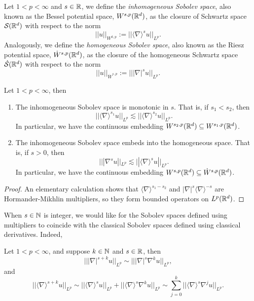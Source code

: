 Let $1 < p < \infty$ and $s \in \mathbb R$, we define the \emph{inhomogeneous Sobolev space}, also known as the Bessel potential space, $W^{s, p} (\mathbb R^d)$, as the closure of Schwartz space $\mathcal S (\mathbb R^d)$ with respect to the norm 
	\[ ||u||_{W^{k, p}} := ||\langle \nabla \rangle^s u||_{L^p}. \]
Analogously, we define the \emph{homogeneous Sobolev space}, also known as the Riesz potential space, $\dot W^{s, p} (\mathbb R^d)$, as the closure of the homogeneous Schwartz space $\dot{\mathcal S} (\mathbb R^d)$ with respect to the norm 
	\[ ||u||_{\dot W^{s, p}} := |||\nabla|^s u||_{L^p}. \]

\begin{proposition}
	Let $1 < p < \infty$, then 
	\begin{enumerate}
		\item The inhomogeneous Sobolev space is monotonic in $s$. That is, if $s_1 < s_2$, then 
			\[ || \langle \nabla \rangle^{s_1} u||_{L^p} \lesssim ||\langle \nabla \rangle^{s_2} u||_{L^{p}}. \]
			In particular, we have the continuous embedding $W^{s_2, p} (\mathbb R^d) \subseteq W^{s_1, p} (\mathbb R^d)$.
			
		\item The inhomogeneous Sobolev space embeds into the homogeneous space. That is, if $s > 0$, then 
			\[ |||\nabla^s u||_{L^p} \lesssim   ||\langle \nabla \rangle^s u||_{L^p}. \]
			In particular, we have the continuous embedding $W^{s, p} (\mathbb R^d) \subseteq \dot W^{s, p} (\mathbb R^d)$.
	\end{enumerate}
\end{proposition}

\begin{proof}
	An elementary calculation shows that $\langle \nabla \rangle^{s_1 - s_2}$ and $|\nabla|^s \langle \nabla \rangle^{-s}$ are Hormander-Mikhlin multipliers, so they form bounded operators on $L^p (\mathbb R^d)$.
\end{proof}

When $s \in \mathbb N$ is integer, we would like for the Sobolev spaces defined using multipliers to coincide with the classical Sobolev spaces defined using classical derivatives. Indeed, 

\begin{proposition}
	Let $1 < p < \infty$, and suppose $k \in \mathbb N$ and $s \in \mathbb R$, then 
		\[ |||\nabla|^{s + k} u||_{L^p} \sim || |\nabla|^s \nabla^k u||_{L^p}, \]
	and		
		\[ || \langle \nabla \rangle^{s + k} u||_{L^p} \sim || \langle \nabla \rangle^s u||_{L^p} + || \langle \nabla \rangle^s \nabla^k u ||_{L^p} \sim \sum_{j = 0}^k ||\langle \nabla \rangle^s \nabla^j u||_{L^p}.\]
\end{proposition}

